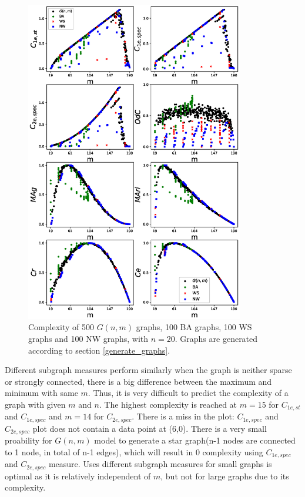 \documentclass[12pt]{article}
\begin{document}
{\begin{figure}[p!]
    \label{fig:small_graphs}
    \clearpage
\end{figure}
\noindent
\newpage
\begin{figure}[p!]
    \centering
    \vspace*{-2in}
    \includegraphics[width = 0.85\textwidth]{complexities_sp.eps}
    \vspace*{-0.8in}
    \caption{Complexity of 500 $G(n,m)$ graphs, 100 BA graphs, 100 WS graphs and 100 NW graphs, with $n=20$. Graphs are generated according to section \ref{generate_graphs}.}
    \label{fig:graph_models}
\end{figure}
\noindent
Different subgraph measures perform similarly when the graph is neither sparse or strongly connected, there is a big difference between the maximum and minimum with same $m$. Thus, it is very difficult to predict the complexity of a graph with given $m$ and $n$. The highest complexity is reached at $m=15$ for $C_{1e,st}$ and $C_{1e,spec}$ and $m=14$ for $C_{2e,spec}$. There is a miss in the plot: $C_{1e,spec}$ and $C_{2e,spec}$ plot does not contain a data point at (6,0). There is a very small proability for $G(n,m)$ model to generate a star graph(n-1 nodes are connected to 1 node, in total of n-1 edges), which will result in 0 complexity using $C_{1e,spec}$ and $C_{2e,spec}$ measure. Uses different subgraph measures for small graphs is optimal as it is relatively independent of $m$, but not for large graphs due to its complexity.\\


}
\end{document}
